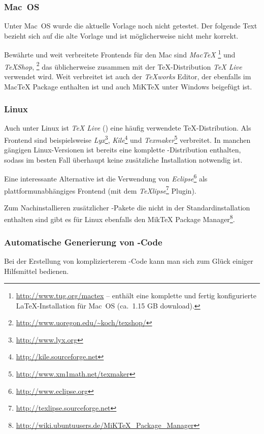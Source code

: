 \subsubsection{Mac~OS}

Unter Mac~OS wurde die aktuelle Vorlage noch nicht getestet. Der folgende Text bezieht sich auf die alte Vorlage und ist möglicherweise nicht mehr korrekt.

Bewährte und weit verbreitete Frontends für den Mac sind \emph{MacTeX}%
\footnote{\url{http://www.tug.org/mactex} -- enthält eine komplette und fertig
konfigurierte LaTeX-Installation für Mac~OS (ca.\ 1.15 GB download).}
und \emph{TeXShop},%
\footnote{\url{http://www.uoregon.edu/~koch/texshop/}}
das üblicherweise zusammen mit der TeX-Distribution \emph{TeX Live} verwendet wird. 
Weit verbreitet ist auch der \emph{TeXworks} Editor, der ebenfalls im MacTeX Package enthalten ist und auch MiKTeX unter Windows beigefügt ist.


\subsubsection{Linux}

Auch unter Linux ist \emph{TeX Live} (\so) eine häufig verwendete TeX-Distri\-bution. 
Als Frontend sind beispielsweise
\emph{Lyx}\footnote{\url{http://www.lyx.org}},
\emph{Kile}\footnote{\url{http://kile.sourceforge.net}} und
\emph{Texmaker}\footnote{\url{http://www.xm1math.net/texmaker}} 
verbreitet.
In manchen gängigen Linux-Versionen ist bereits eine komplette \latex-Distribution enthalten, sodass im besten Fall überhaupt keine zusätzliche Installation notwendig ist.  

Eine interessante Alternative ist die Verwendung von
\emph{Eclipse}\footnote{\url{http://www.eclipse.org}} als plattformunabhängiges Frontend 
(mit dem \emph{TeXlipse}\footnote{\url{http://texlipse.sourceforge.net}}
Plugin).


Zum Nachinstallieren zusätzlicher \latex-Pakete die nicht in der
Standardinstallation enthalten sind gibt es für Linux ebenfalls den MikTeX
Package
Manager\footnote{\url{http://wiki.ubuntuusers.de/MiKTeX_Package_Manager}}.

\subsubsection{Automatische Generierung von \latex-Code}
Bei der Erstellung von komplizierterem \latex-Code kann man sich zum Glück
einiger Hilfsmittel bedienen.

